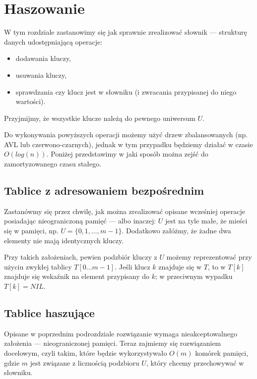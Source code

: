 \section{Haszowanie}

W tym rozdziale zastanowimy się jak sprawnie zrealizować słownik --- strukturę danych udostępniającą operacje: 
\begin{itemize}
	\item dodawania kluczy,
	\item usuwania kluczy,
	\item sprawdzania czy klucz jest w słowniku (i zwracania przypisanej do niego wartości).
\end{itemize}
Przyjmijmy, że wszystkie klucze należą do pewnego uniwersum $U$.

Do wykonywania powyższych operacji możemy użyć drzew zbalansowanych (np. AVL lub czerwono-czarnych), jednak w tym przypadku będziemy działać w czasie $O(log(n))$. Poniżej przedstawimy w jaki sposób można zejść do zamortyzowanego czasu stałego.

\subsection{Tablice z adresowaniem bezpośrednim}
Zastanówmy się przez chwilę, jak można zrealizować opisane wcześniej operacje posiadając nieograniczoną pamięć --- albo inaczej: $U$ jest na tyle małe, że mieści się w pamięci, np. $U = \{0, 1, \dots, m - 1\}$. Dodatkowo załóżmy, że żadne dwa elementy nie mają identycznych kluczy.

Przy takich założeniach, pewien podzbiór kluczy z $U$ możemy reprezentować przy użyciu zwykłej tablicy $T[0 \dots m - 1]$. Jeśli klucz $k$ znajduje się w $T$, to w $T[k]$ znajduje się wskaźnik na element przypisany do $k$; w przeciwnym wypadku $T[k] = NIL$.

\subsection{Tablice haszujące}
Opisane w poprzednim podrozdziale rozwiązanie wymaga nieakceptowalnego założenia --- nieograniczonej pamięci. Teraz zajmiemy się rozwiązaniem docelowym, czyli takim, które będzie wykorzystywało $O(m)$ komórek pamięci, gdzie $m$ jest związane z licznością podzbioru $U$, który chcemy przechowywać w słowniku.

